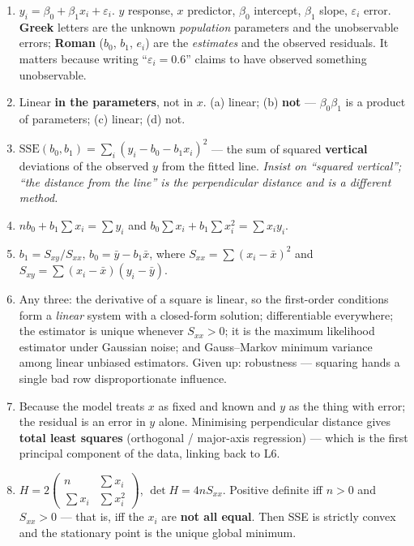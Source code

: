 \documentclass[11pt,a4paper]{article}
\newcommand{\A}[1]{\item[\textbf{#1}]}
\begin{document}
\begin{enumerate}[leftmargin=1.9cm]
\A{U5.1} $y_i = \beta_0 + \beta_1 x_i + \varepsilon_i$. $y$ response,
$x$ predictor, $\beta_0$ intercept, $\beta_1$ slope, $\varepsilon_i$ error.
\textbf{Greek} letters are the unknown \emph{population} parameters and the
unobservable errors; \textbf{Roman} ($b_0$, $b_1$, $e_i$) are the
\emph{estimates} and the observed residuals. It matters because writing
``$\varepsilon_i = 0.6$'' claims to have observed something unobservable.

\A{U5.2} Linear \textbf{in the parameters}, not in $x$. (a) linear;
(b) \textbf{not} --- $\beta_0\beta_1$ is a product of parameters; (c) linear;
(d) not.

\A{U5.3} $\text{SSE}(b_0,b_1) = \sum_i (y_i - b_0 - b_1x_i)^2$ --- the sum of
squared \textbf{vertical} deviations of the observed $y$ from the fitted line.
\emph{Insist on ``squared vertical''; ``the distance from the line'' is the
perpendicular distance and is a different method.}

\A{U5.4} $n b_0 + b_1\sum x_i = \sum y_i$ and
$b_0\sum x_i + b_1\sum x_i^2 = \sum x_iy_i$.

\A{U5.5} $b_1 = S_{xy}/S_{xx}$, $b_0 = \bar y - b_1\bar x$, where
$S_{xx} = \sum(x_i-\bar x)^2$ and $S_{xy} = \sum(x_i-\bar x)(y_i-\bar y)$.

\A{U5.6} Any three: the derivative of a square is linear, so the first-order
conditions form a \emph{linear} system with a closed-form solution;
differentiable everywhere; the estimator is unique whenever $S_{xx} > 0$;
it is the maximum likelihood estimator under Gaussian noise; and Gauss--Markov
minimum variance among linear unbiased estimators. Given up: robustness ---
squaring hands a single bad row disproportionate influence.

\A{U5.7} Because the model treats $x$ as fixed and known and $y$ as the thing
with error; the residual is an error in $y$ alone. Minimising perpendicular
distance gives \textbf{total least squares} (orthogonal / major-axis
regression) --- which is the first principal component of the data, linking
back to L6.

\A{U5.8} $H = 2\begin{pmatrix} n & \sum x_i\\ \sum x_i & \sum x_i^2
\end{pmatrix}$, $\det H = 4nS_{xx}$. Positive definite iff $n > 0$ and
$S_{xx} > 0$ --- that is, iff the $x_i$ are \textbf{not all equal}. Then SSE is
strictly convex and the stationary point is the unique global minimum.


\end{enumerate}
\end{document}
